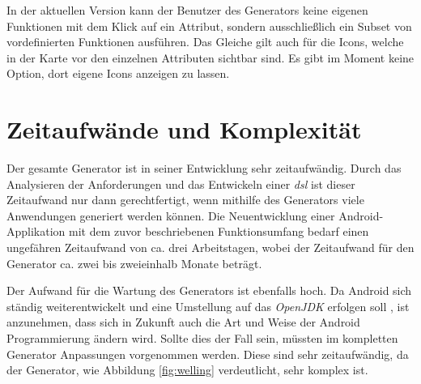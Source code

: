 In der aktuellen Version kann der Benutzer des Generators keine eigenen Funktionen mit dem Klick auf ein Attribut, sondern ausschließlich ein Subset von vordefinierten Funktionen ausführen. Das Gleiche gilt auch für die Icons, welche in der Karte vor den einzelnen Attributen sichtbar sind. Es gibt im Moment keine Option, dort eigene Icons anzeigen zu lassen.

\section{Zeitaufwände und Komplexität}

Der gesamte Generator ist in seiner Entwicklung sehr zeitaufwändig. Durch das Analysieren der Anforderungen und das Entwickeln einer \textit{\acf{dsl}} ist dieser Zeitaufwand nur dann gerechtfertigt, wenn mithilfe des Generators viele Anwendungen generiert werden können. Die Neuentwicklung einer Android-Applikation mit dem zuvor beschriebenen Funktionsumfang bedarf einen ungefähren Zeitaufwand von ca. drei Arbeitstagen, wobei der Zeitaufwand für den Generator ca. zwei bis zweieinhalb Monate beträgt.

Der Aufwand für die Wartung des Generators ist ebenfalls hoch. Da Android sich ständig weiterentwickelt und eine Umstellung auf das \textit{OpenJDK} erfolgen soll \cite{jdk}, ist anzunehmen, dass sich in Zukunft auch die Art und Weise der Android Programmierung ändern wird. Sollte dies der Fall sein, müssten im kompletten Generator Anpassungen vorgenommen werden. Diese sind sehr zeitaufwändig, da der Generator, wie Abbildung \ref{fig:welling} verdeutlicht, sehr komplex ist.

